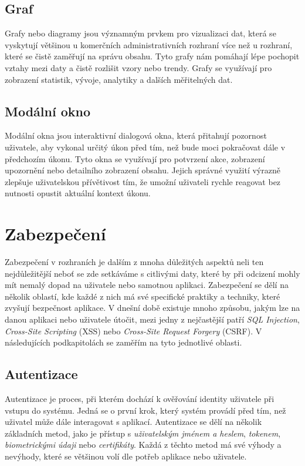 \subsection*{Graf}
\label{subsec:admin-tags-chart}
Grafy nebo diagramy jsou významným prvkem pro vizualizaci dat, která se vyskytují většinou u komerčních administrativních rozhraní více než u rozhraní, které se čistě zaměřují na správu obsahu. Tyto grafy nám pomáhají lépe pochopit vztahy mezi daty a čistě rozlišit vzory nebo trendy. Grafy se využívají pro zobrazení statistik, vývoje, analytiky a dalších měřitelných dat.

\subsection*{Modální okno}
\label{subsec:admin-tags-modal}
Modální okna jsou interaktivní dialogová okna, která přitahují pozornost uživatele, aby vykonal určitý úkon před tím, než bude moci pokračovat dále v předchozím úkonu. Tyto okna se využívají pro potvrzení akce, zobrazení upozornění nebo detailního zobrazení obsahu. Jejich správné využití výrazně zlepšuje uživatelskou přívětivost tím, že umožní uživateli rychle reagovat bez nutnosti opustit aktuální kontext úkonu.

\section{Zabezpečení}
\label{sec:security}
Zabezpečení v rozhraních je dalším z mnoha důležitých aspektů neli ten nejdůležitější neboť se zde setkáváme s citlivými daty, které by při odcizení mohly mít nemalý dopad na uživatele nebo samotnou aplikaci. Zabezpečení se dělí na několik oblastí, kde každé z nich má své specifické praktiky a techniky, které zvyšují bezpečnost aplikace. V dnešní době existuje mnoho způsobu, jakým lze na danou aplikaci nebo uživatele útočit, mezi jedny z nejčastější patří \textit{SQL Injection}, \textit{Cross-Site Scripting} (XSS) nebo \textit{Cross-Site Request Forgery} (CSRF). V následujících podkapitolách se zaměřím na tyto jednotlivé oblasti.

\subsection{Autentizace}
\label{subsec:security-authentication}
Autentizace je proces, při kterém dochází k ověřování identity uživatele při vstupu do systému. Jedná se o první krok, který systém provádí před tím, než uživatel může dále interagovat s aplikací. Autentizace se dělí na několik základních metod, jako je přístup s \textit{uživatelským jménem a heslem}, \textit{tokenem}, \textit{biometrickými údaji} nebo \textit{certifikáty}. Každá z těchto metod má své výhody a nevýhody, které se většinou volí dle potřeb aplikace nebo uživatele.

